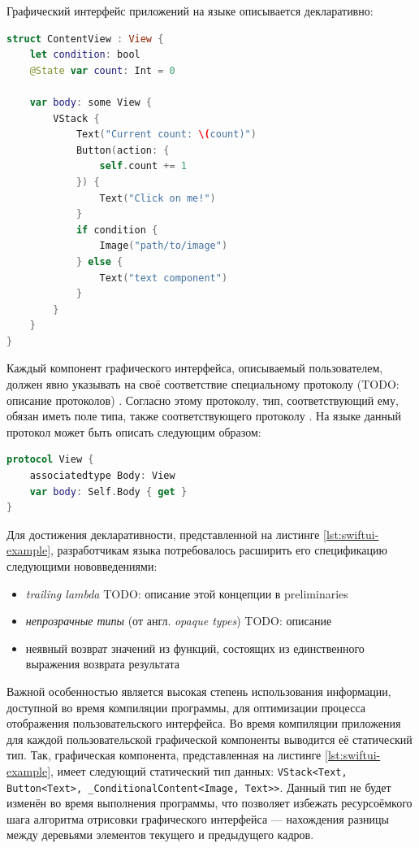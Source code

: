 Графический интерфейс приложений на языке 
описывается декларативно:
\begin{lstlisting}[language=Swift,caption=Счётчик нажатия кнопки на языке
\name{SwiftUI},label={lst:swiftui-example}]
struct ContentView : View {
    let condition: bool
    @State var count: Int = 0
	
    var body: some View {
        VStack {
            Text("Current count: \(count)")
            Button(action: {
                self.count += 1
            }) {
                Text("Click on me!")
            }
            if condition {
                Image("path/to/image")
            } else {
                Text("text component")
            }
        }
    }
}
\end{lstlisting}
Каждый компонент графического интерфейса, описываемый пользователем, должен
явно указывать на своё соответствие специальному протоколу (TODO: описание протоколов)
. Согласно этому протоколу, тип, соответствующий ему, обязан
иметь поле  типа, также соответствующего протоколу .
На языке  данный протокол может быть описать следующим образом:
\begin{lstlisting}[language=Swift, caption=Реализация протокола \name{View}
на языке \name{Swift}]
protocol View {
    associatedtype Body: View
    var body: Self.Body { get }
}
\end{lstlisting}

Для достижения декларативности, представленной на листинге
\ref{lst:swiftui-example}, разработчикам языка  потребовалось
расширить его спецификацию следующими нововведениями:
\begin{itemize}
	\item \textit{trailing lambda} TODO: описание этой концепции в
	preliminaries
	\item \textit{непрозрачные типы}
	(от англ. \textit{opaque types}) TODO: описание
	\item неявный возврат значений из функций, состоящих из единственного
	выражения возврата результата
\end{itemize}

Важной особенностью  является высокая степень использования
информации, доступной во время компиляции программы, для оптимизации
процесса отображения пользовательского интерфейса. Во время компиляции
приложения для каждой пользовательской графической компоненты выводится
её статический тип. Так, графическая компонента, представленная на листинге
\ref{lst:swiftui-example}, имеет следующий статический тип данных:\newline
\texttt{VStack<Text, Button<Text>, \_ConditionalContent<Image, Text>>}.
Данный тип не будет изменён во время выполнения программы, что позволяет
избежать ресурсоёмкого шага алгоритма отрисовки графического интерфейса
--- нахождения разницы между деревьями элементов текущего и предыдущего
кадров.

